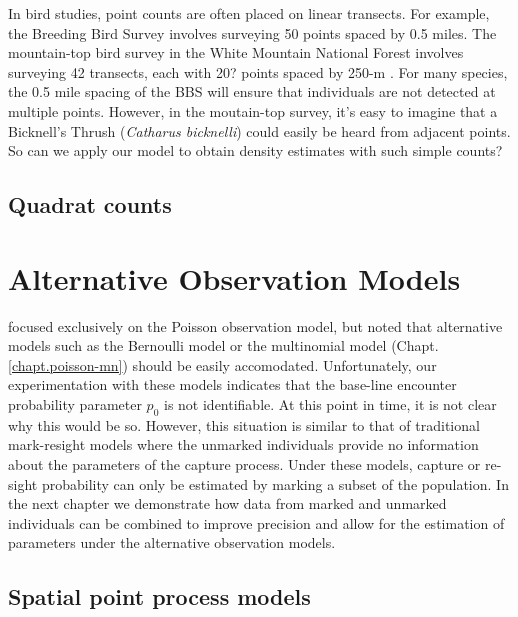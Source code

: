 In bird studies, point counts are often placed on linear transects. For
example, the Breeding Bird Survey involves surveying 50 points spaced
by 0.5 miles. The mountain-top bird survey in the White Mountain
National Forest involves surveying 42 transects, each with 20? points
spaced by 250-m \citep{king_etal:2008}. For many species, the 0.5 mile
spacing of the BBS will ensure that individuals are not detected at
multiple points. However, in the moutain-top survey, it's easy to
imagine that a Bicknell's Thrush (\emph{Catharus bicknelli}) could
easily be heard from adjacent points. So can we apply our model to
obtain density estimates with such simple counts?



\subsection{Quadrat counts}





\section{Alternative Observation Models}
\label{Sect.alt-obsmods}

\citet{chandler_royle:2012} focused exclusively on the Poisson
observation model, but noted that alternative models such as the
Bernoulli model or the multinomial model (Chapt. \ref{chapt.poisson-mn}) should
be easily accomodated. Unfortunately, our experimentation with these models
indicates that the base-line encounter probability parameter $p_0$ is
not identifiable. At this point in time, it is not clear why this
would be so. However, this situation is similar to that of traditional
mark-resight models where the unmarked individuals provide no
information about the parameters of the capture process. Under these
models, capture or re-sight probability can only be estimated by
marking a subset of the population. In the next chapter we demonstrate
how data from marked and unmarked individuals can be combined to
improve precision and allow for the estimation of parameters under the
alternative observation models.



\subsection{Spatial point process models}



